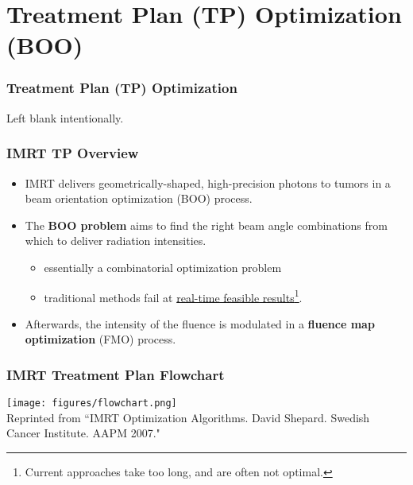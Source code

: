 \section{Treatment Plan (TP) Optimization (BOO)}
\begin{frame}
\frametitle{Treatment Plan (TP) Optimization}
\centering Left blank intentionally.
\end{frame}

\begin{frame}
\frametitle{IMRT TP Overview}
\begin{itemize}
	\item IMRT delivers geometrically-shaped, high-precision photons to tumors in a beam orientation optimization (BOO) process. %
	\vspace{0.3cm}
	\item The \textbf{BOO problem} aims to find the right beam angle combinations from which to deliver radiation intensities.
	\vspace{0.2cm}
	\begin{itemize}
		\item essentially a combinatorial optimization problem 
		\vspace{0.2cm}
		\item traditional methods fail at \underline{real-time feasible results\footnote{Current approaches take too long, and are often not optimal.}}.
	\end{itemize}
	\vspace{0.1cm}
	\item Afterwards, the intensity of the fluence is modulated in a \textbf{fluence map optimization} (FMO) process.
%
\end{itemize}
\end{frame}

\begin{frame}
	\frametitle{IMRT Treatment Plan Flowchart}
	\centering
	\texttt{[image: figures/flowchart.png]} \\
	\tiny Reprinted from ``IMRT Optimization Algorithms. David Shepard. Swedish Cancer Institute. AAPM 2007."
\end{frame}

